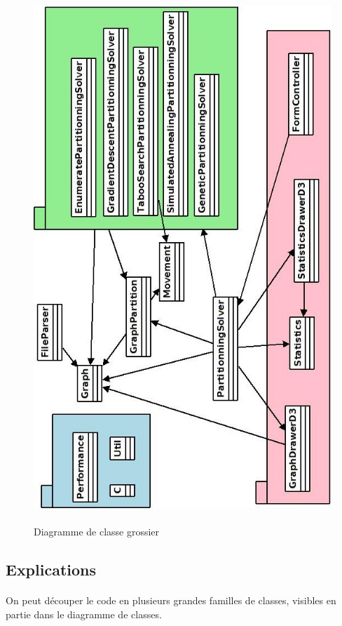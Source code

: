 \documentclass[12pt]{article}
\begin{document}
\begin{figure}[!h]
	\begin{center}
		\includegraphics[height=20cm]{pictures/classeGraph.jpeg}
	\end{center}
	\caption{Diagramme de classe grossier \label{fig:classdiagram}}
\end{figure}
\subsection{Explications}

\paragraph{}On peut découper le code en plusieurs grandes familles de classes, visibles en partie dans le diagramme de classes.
\end{document}
